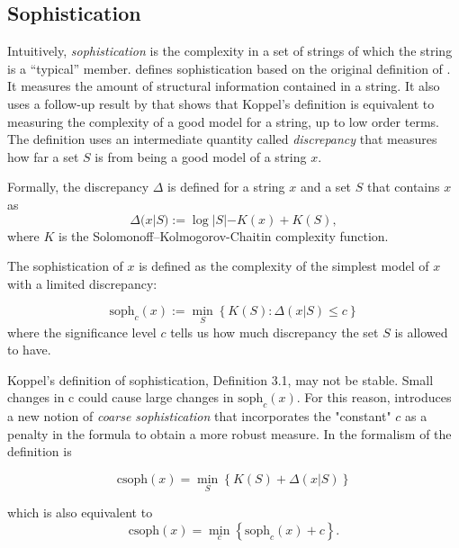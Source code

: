 \subsection{Sophistication}

Intuitively, \emph{sophistication} is the complexity in a set of strings of which
the string is a ``typical'' member.
\textcite{motaSophisticationRandomnessDeficiency2013} defines sophistication
based on the original definition of \textcite{koppelStructure1988,
  koppelAlmostMachineindependentTheory1991a}. It measures the amount of structural
information contained in a string. It also uses a follow-up result by
\parencite{vitanyiMeaningfulInformation2006} that shows that Koppel's definition
is equivalent to measuring the complexity of a good model for a string, up to
low order terms. The definition uses an intermediate quantity called
\emph{discrepancy} that measures how far a set $S$ is from being a good model
of a string $x$.

Formally, the discrepancy $\Delta$ is defined for a string $x$ and a set $S$ that contains $x$ as
\begin{equation}
  \label{eq:6}
  \Delta(x|S) := \log |S| - K(x) + K(S),
\end{equation}
where $K$ is the Solomonoff–Kolmogorov-Chaitin complexity function.

The sophistication of $x$ is defined as the complexity of the simplest model of
$x$ with a limited discrepancy:

\begin{equation}
  \label{eq:7}
  \text{soph}_{c}(x) := \min_{S}\left\{ K(S): \Delta(x|S) \leq c \right\}
\end{equation}
where the significance level $c$ tells us how much discrepancy the set $S$ is allowed to have.

Koppel’s definition of sophistication, Definition 3.1, may not be stable. Small
changes in c could cause large changes in $\text{soph}_{c}(x)$. For this reason,
\textcite{antunesSophisticationRevisited2009} introduces a new notion of \emph{coarse
sophistication} that incorporates the "constant" $c$ as a penalty in the formula
to obtain a more robust measure.
In the formalism of \textcite{motaSophisticationRandomnessDeficiency2013} the
definition is

\begin{equation}
  \label{eq:8}
  \text{csoph}(x) = \min_{S}\left\{ K(S) + \Delta(x|S) \right\}
\end{equation}

which is also equivalent to
\begin{equation}
  \label{eq:8b}
  \text{csoph}(x) = \min_{c}\left\{ \text{soph}_{c}(x) + c \right\}.
\end{equation}

